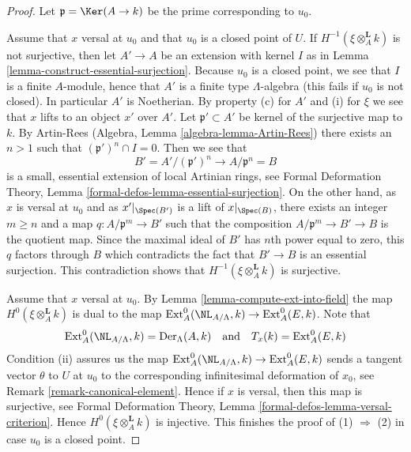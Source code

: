 \begin{proof}
Let $\mathfrak p = \Ker(A \to k)$ be the prime corresponding to $u_0$.

\medskip\noindent
Assume that $x$ versal at $u_0$ and that $u_0$ is a closed point of $U$.
If $H^{-1}(\xi \otimes_A^{\mathbf{L}} k)$ is not surjective, then
let $A' \to A$ be an extension with kernel $I$ as in
Lemma \ref{lemma-construct-essential-surjection}.
Because $u_0$ is a closed point, we see that $I$ is a finite $A$-module,
hence that $A'$ is a finite type $\Lambda$-algebra (this fails if
$u_0$ is not closed). In particular $A'$ is Noetherian.
By property (c) for $A'$ and (i) for $\xi$ we see that $x$ lifts to
an object $x'$ over $A'$.
Let $\mathfrak p' \subset A'$ be kernel of the surjective map to $k$.
By Artin-Rees (Algebra, Lemma \ref{algebra-lemma-Artin-Rees})
there exists an $n > 1$ such that $(\mathfrak p')^n \cap I = 0$.
Then we see that
$$
B' = A'/(\mathfrak p')^n \longrightarrow A/\mathfrak p^n = B
$$
is a small, essential extension of local Artinian rings, see
Formal Deformation Theory, Lemma
\ref{formal-defos-lemma-essential-surjection}.
On the other hand, as $x$ is versal at $u_0$ and as $x'|_{\Spec(B')}$
is a lift of $x|_{\Spec(B)}$, there exists an integer
$m \geq n$ and a map $q : A/\mathfrak p^m \to B'$
such that the composition
$A/\mathfrak p^m \to B' \to B$ is the quotient map.
Since the maximal ideal of $B'$ has $n$th power equal to zero, this
$q$ factors through $B$ which contradicts the fact that $B' \to B$ is an
essential surjection. This contradiction shows that
$H^{-1}(\xi \otimes_A^{\mathbf{L}} k)$
is surjective.

\medskip\noindent
Assume that $x$ versal at $u_0$. By Lemma \ref{lemma-compute-ext-into-field}
the map $H^0(\xi \otimes_A^{\mathbf{L}} k)$ is dual to the map
$\text{Ext}^0_A(\NL_{A/\Lambda}, k) \to \text{Ext}^0_A(E, k)$. Note that
$$
\text{Ext}^0_A(\NL_{A/\Lambda}, k) = \text{Der}_\Lambda(A, k)
\quad\text{and}\quad
T_x(k) = \text{Ext}^0_A(E, k)
$$
Condition (ii) assures us the map
$\text{Ext}^0_A(\NL_{A/\Lambda}, k) \to \text{Ext}^0_A(E, k)$
sends a tangent vector $\theta$ to $U$ at $u_0$ to the corresponding
infinitesimal deformation of $x_0$, see Remark \ref{remark-canonical-element}.
Hence if $x$ is versal, then this map is surjective, see
Formal Deformation Theory, Lemma \ref{formal-defos-lemma-versal-criterion}.
Hence $H^0(\xi \otimes_A^{\mathbf{L}} k)$ is injective.
This finishes the proof of (1) $\Rightarrow$ (2) in case $u_0$ is a
closed point.


\end{proof}
